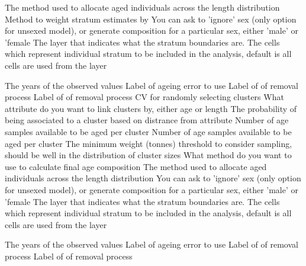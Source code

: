  {The method used to allocate aged individuals across the length distribution}
 {Method to weight stratum estimates by}
 {You can ask to 'ignore' sex (only option for unsexed model), or generate composition for a particular sex, either 'male' or 'female}
 {The layer that indicates what the stratum boundaries are.}
 {The cells which represent individual stratum to be included in the analysis, default is all cells are used from the layer}
\par\textbf{}\par
{} {The years of the observed values}
 {Label of ageing error to use}
 {Label of of removal process}
 {Label of of removal process}
 {CV for randomly selecting clusters}
 {What attribute do you want to link clusters by, either age or length}
 {The probability of being associated to a cluster based on distrance from attribute}
 {Number of age samples available to be aged per cluster}
 {Number of age samples available to be aged per cluster}
 {The minimum weight (tonnes) threshold to consider sampling, should be well in the distribution of cluster sizes}
 {What method do you want to use to calculate final age composition}
 {The method used to allocate aged individuals across the length distribution}
 {You can ask to 'ignore' sex (only option for unsexed model), or generate composition for a particular sex, either 'male' or 'female}
 {The layer that indicates what the stratum boundaries are.}
 {The cells which represent individual stratum to be included in the analysis, default is all cells are used from the layer}
\par\textbf{}\par
{} {The years of the observed values}
 {Label of ageing error to use}
 {Label of of removal process}
 {Label of of removal process}
